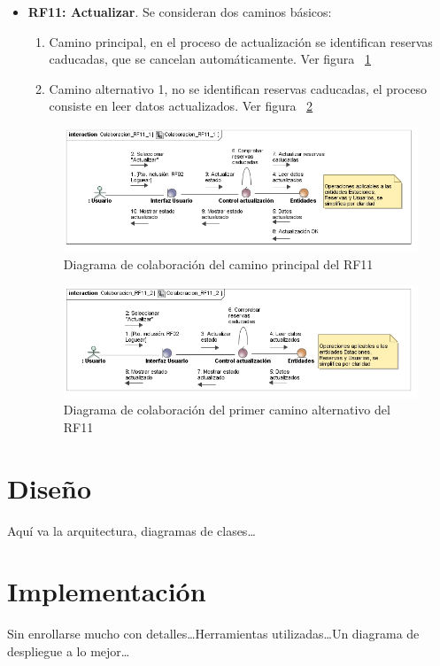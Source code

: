 \begin{itemize}
	\FloatBarrier
	\item \textbf{RF11: Actualizar}. Se consideran dos caminos básicos: 
	\begin{enumerate}
		\item Camino principal, en el proceso de actualización se identifican reservas caducadas, que se cancelan automáticamente. Ver figura ~\ref{fig:diagramaColaboracion_RF11_1}
		\item Camino alternativo 1, no se identifican reservas caducadas, el proceso consiste en leer datos actualizados. Ver figura ~\ref{fig:diagramaColaboracion_RF11_2}
	\end{enumerate}
	\begin{figure} [!htb]
		\centering
		\includegraphics[width=\linewidth,height=\textheight,keepaspectratio]{Images/Diagramas/04_Colaboracion_RF11_1}
		\caption{Diagrama de colaboración del camino principal del RF11}
		\label{fig:diagramaColaboracion_RF11_1}
	\end{figure}
	\begin{figure} [!htb]
		\centering
		\includegraphics[width=\linewidth,height=\textheight,keepaspectratio]{Images/Diagramas/04_Colaboracion_RF11_2}
		\caption{Diagrama de colaboración del primer camino alternativo del RF11}
		\label{fig:diagramaColaboracion_RF11_2}
	\end{figure}
		
\end{itemize}



\section{Diseño}

Aquí va la arquitectura, diagramas de clases\dots



\section{Implementación}

Sin enrollarse mucho con detalles\dots Herramientas utilizadas\dots Un diagrama de despliegue a lo mejor\dots